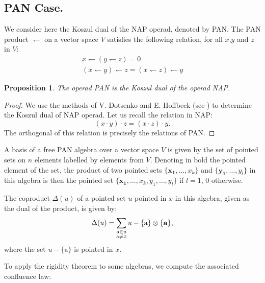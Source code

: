 \documentclass[11pt,leqno]{amsart}
\theoremstyle{definition}
\theoremstyle{plain}
\newtheorem{proposition}[definition]{Proposition}
\begin{document}
\subsection{PAN Case.}

We consider here the Koszul dual of the NAP operad, denoted by PAN. The PAN product $\leftharpoondown$ on a vector space $V$ satisfies the following relation, for all $x$,$y$ and $z$ in $V$:
\begin{align*} 
x \leftharpoondown (y \leftharpoondown z) = 0 \\
(x \leftharpoondown y) \leftharpoondown z = (x \leftharpoondown z) \leftharpoondown y
\label{PAN rel}
\end{align*}

\begin{proposition}
The operad PAN is the Koszul dual of the operad NAP. 
\end{proposition}

\begin{proof} 
We use the methods of V. Dotsenko and E. Hoffbeck (see \cite{Hoffbeck}) to determine the Koszul dual of NAP operad. Let us recall the relation in NAP:
\begin{equation*} 
(x \cdot y) \cdot z=(x \cdot z) \cdot y.
\end{equation*}
The orthogonal of this relation is precisely the relations of PAN.
\end{proof}

A basis of a free PAN algebra over a vector space $V$ is given by the set of pointed sets on $n$ elements labelled by elements from $V$. 
Denoting in bold the pointed element of the set, the product of two pointed sets $\{\mathbf{x_1}, \ldots, x_k\}$ and $\{\mathbf{y_1}, \ldots, y_l\}$ in this algebra is then the pointed set $\{\mathbf{x_1}, \ldots, x_k, y_1, \ldots, y_l\}$ if $l=1$, $0$ otherwise.


The coproduct $\Delta(u)$ of a pointed set $u$ pointed in $x$ in this algebra, given as the dual of the product, is given by:
\begin{equation} 
\Delta(u) = \sum_{\substack{\mathrm{a} \in u \\ \mathrm{a} \neq x}} u-\{\mathrm{a}\} \otimes \{\text{\textbf{a}} \},
\end{equation}
where the set $u-\{\mathrm{a}\}$ is pointed in $x$.


To apply the rigidity theorem to some algebras, we compute the associated confluence law:
\end{document}
